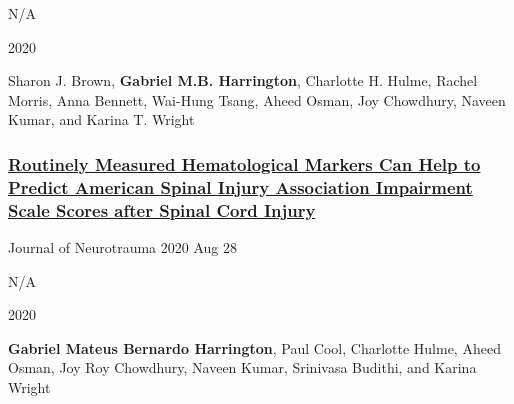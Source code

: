 \documentclass[
]{article}
\begin{document}
N/A

2020

Sharon J. Brown, \textbf{Gabriel M.B. Harrington}, Charlotte H. Hulme,
Rachel Morris, Anna Bennett, Wai-Hung Tsang, Aheed Osman, Joy Chowdhury,
Naveen Kumar, and Karina T. Wright

\hypertarget{routinely-measured-hematological-markers-can-help-to-predict-american-spinal-injury-association-impairment-scale-scores-after-spinal-cord-injury}{%
\subsubsection{\texorpdfstring{\href{https://doi.org/10.1089/neu.2020.7144}{Routinely
Measured Hematological Markers Can Help to Predict American Spinal
Injury Association Impairment Scale Scores after Spinal Cord
Injury}}{Routinely Measured Hematological Markers Can Help to Predict American Spinal Injury Association Impairment Scale Scores after Spinal Cord Injury}}\label{routinely-measured-hematological-markers-can-help-to-predict-american-spinal-injury-association-impairment-scale-scores-after-spinal-cord-injury}}

Journal of Neurotrauma 2020 Aug 28

N/A

2020

\textbf{Gabriel Mateus Bernardo Harrington}, Paul Cool, Charlotte Hulme,
Aheed Osman, Joy Roy Chowdhury, Naveen Kumar, Srinivasa Budithi, and
Karina Wright
\end{document}
